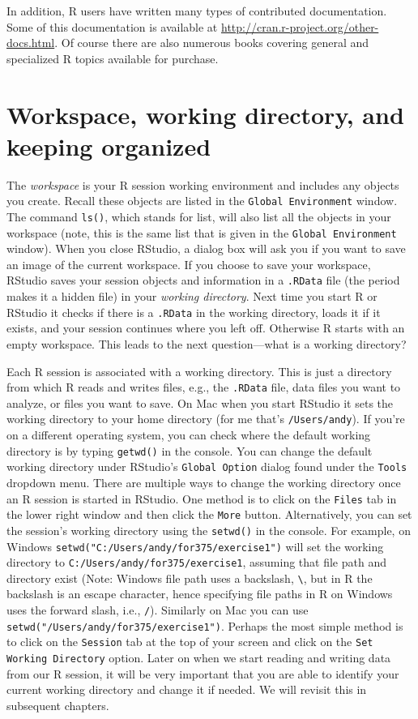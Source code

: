\documentclass[12pt,oneside]{book}\usepackage[]{graphicx}\usepackage[]{color}
\begin{document}
In addition, R users have written many types of contributed documentation. Some of this documentation is available at \url{http://cran.r-project.org/other-docs.html}. Of course there are also numerous books covering general and specialized R topics available for purchase.

\section{Workspace, working directory, and keeping organized}

The \emph{workspace} is your R session working environment and includes any objects you create. Recall these objects are listed in the \verb+Global Environment+ window. The command \verb+ls()+, which stands for list, will also list all the objects in your workspace (note, this is the same list that is given in the \verb+Global Environment+ window). When you close RStudio, a dialog box will ask you if you want to save an image of the current workspace. If you choose to save your workspace, RStudio saves your session objects and information in a \verb+.RData+ file (the period makes it a hidden file) in your \emph{working directory}. Next time you start R or RStudio it checks if there is a \verb+.RData+ in the working directory, loads it if it exists, and your session continues where you left off. Otherwise R starts with an empty workspace. This leads to the next question---what is a working directory? 

Each R session is associated with a working directory. This is just a directory from which R reads and writes files, e.g., the \verb+.RData+ file, data files you want to analyze, or files you want to save. On Mac when you start RStudio it sets the working directory to your home directory (for me that's \verb+/Users/andy+). If you're on a different operating system, you can check where the default working directory is by typing \verb+getwd()+ in the console. You can change the default working directory under RStudio's \verb+Global Option+ dialog found under the \verb+Tools+ dropdown menu. There are multiple ways to change the working directory once an R session is started in RStudio. One method is to click on the \verb+Files+ tab in the lower right window and then click the \verb+More+ button. Alternatively, you can set the session's working directory using the \verb+setwd()+ in the console. For example, on Windows \verb+setwd("C:/Users/andy/for375/exercise1")+ will set the working directory to \verb+C:/Users/andy/for375/exercise1+, assuming that file path and directory exist (Note: Windows file path uses a backslash, \verb+\+, but in R the backslash is an escape character, hence specifying file paths in R on Windows uses the forward slash, i.e., \verb+/+). Similarly on Mac you can use \verb+setwd("/Users/andy/for375/exercise1")+. Perhaps the most simple method is to click on the \verb+Session+ tab at the top of your screen and click on the \verb+Set Working Directory+ option. Later on when we start reading and writing data from our R session, it will be very important that you are able to identify your current working directory and change it if needed. We will revisit this in subsequent chapters.
\end{document}
